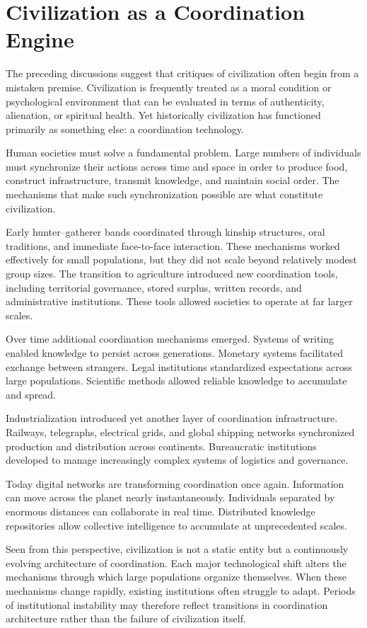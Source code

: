 \documentclass[12pt]{article}
\begin{document}
\section{Civilization as a Coordination Engine}

The preceding discussions suggest that critiques of civilization often begin from a mistaken premise. Civilization is frequently treated as a moral condition or psychological environment that can be evaluated in terms of authenticity, alienation, or spiritual health. Yet historically civilization has functioned primarily as something else: a coordination technology.

Human societies must solve a fundamental problem. Large numbers of individuals must synchronize their actions across time and space in order to produce food, construct infrastructure, transmit knowledge, and maintain social order. The mechanisms that make such synchronization possible are what constitute civilization.

Early hunter--gatherer bands coordinated through kinship structures, oral traditions, and immediate face-to-face interaction. These mechanisms worked effectively for small populations, but they did not scale beyond relatively modest group sizes. The transition to agriculture introduced new coordination tools, including territorial governance, stored surplus, written records, and administrative institutions. These tools allowed societies to operate at far larger scales.

Over time additional coordination mechanisms emerged. Systems of writing enabled knowledge to persist across generations. Monetary systems facilitated exchange between strangers. Legal institutions standardized expectations across large populations. Scientific methods allowed reliable knowledge to accumulate and spread.

Industrialization introduced yet another layer of coordination infrastructure. Railways, telegraphs, electrical grids, and global shipping networks synchronized production and distribution across continents. Bureaucratic institutions developed to manage increasingly complex systems of logistics and governance.

Today digital networks are transforming coordination once again. Information can move across the planet nearly instantaneously. Individuals separated by enormous distances can collaborate in real time. Distributed knowledge repositories allow collective intelligence to accumulate at unprecedented scales.

Seen from this perspective, civilization is not a static entity but a continuously evolving architecture of coordination. Each major technological shift alters the mechanisms through which large populations organize themselves. When these mechanisms change rapidly, existing institutions often struggle to adapt. Periods of institutional instability may therefore reflect transitions in coordination architecture rather than the failure of civilization itself.
\end{document}
